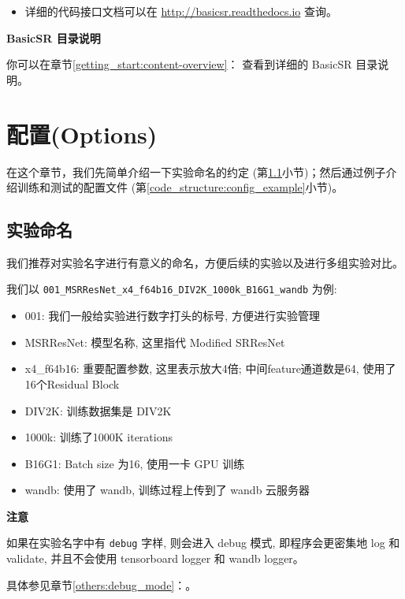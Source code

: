 \documentclass[../main.tex]{subfiles}
\begin{document}
\begin{itemize}
    \item 详细的代码接口文档可以在 \url{http://basicsr.readthedocs.io} 查询。
\end{itemize}

\begin{note} %
    \textbf{BasicSR 目录说明}

    你可以在章节\ref{getting_start:content-overview}： 查看到详细的 BasicSR 目录说明。
\end{note}

\section{配置(Options)}\label{code_structure:config}

在这个章节，我们先简单介绍一下实验命名的约定 (第\ref{code_structure:name_convention}小节)；然后通过例子介绍训练和测试的配置文件 (第\ref{code_structure:config_example}小节)。

\subsection{实验命名}\label{code_structure:name_convention}

我们推荐对实验名字进行有意义的命名，方便后续的实验以及进行多组实验对比。

我们以 \texttt{001\_MSRResNet\_x4\_f64b16\_DIV2K\_1000k\_B16G1\_wandb} 为例:

\begin{itemize}
    \item 001: 我们一般给实验进行数字打头的标号, 方便进行实验管理
    \item MSRResNet: 模型名称, 这里指代 Modified SRResNet
    \item x4\_f64b16: 重要配置参数, 这里表示放大4倍; 中间feature通道数是64, 使用了16个Residual Block
    \item DIV2K: 训练数据集是 DIV2K
    \item 1000k: 训练了1000K iterations
    \item B16G1: Batch size 为16, 使用一卡 GPU 训练
    \item wandb: 使用了 wandb, 训练过程上传到了 wandb 云服务器
\end{itemize}

\begin{hl} %
    \textbf{注意}

    如果在实验名字中有 \texttt{debug} 字样, 则会进入 debug 模式, 即程序会更密集地 log 和 validate, 并且不会使用 tensorboard logger 和 wandb logger。

    具体参见章节\ref{others:debug_mode}：。
\end{hl}
\end{document}
